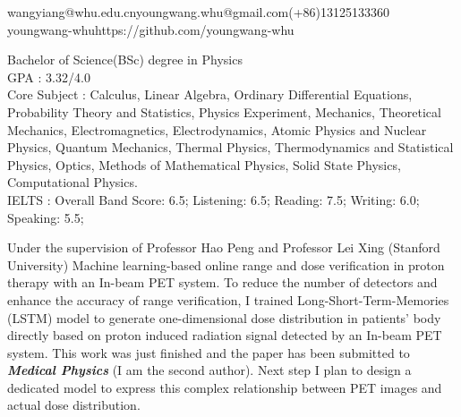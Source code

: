 \documentclass{resume}
\begin{document}
\name{ \textcolor[RGB]{172,0,230}{Yiang} \textcolor[RGB]{0,57,230}{Wang} }
{wangyiang@whu.edu.cn}{youngwang.whu@gmail.com}{(+86)13125133360}
{youngwang-whu}{https://github.com/youngwang-whu}




\textcolor[RGB]{172,0,230}{Bachelor of Science(BSc)} degree in \textcolor[RGB]{0,57,230}{Physics}\\
\textcolor[RGB]{172,0,230}{GPA} : \quad \textcolor[RGB]{0,57,230}{3.32/4.0} \\
\textcolor[RGB]{172,0,230}{Core Subject} :  \quad Calculus, \quad Linear Algebra, \quad Ordinary Differential Equations, \quad Probability Theory and Statistics,  \quad Physics Experiment, \quad Mechanics, \quad Theoretical Mechanics, \quad Electromagnetics, \quad Electrodynamics, \quad Atomic Physics and Nuclear Physics,  \quad Quantum Mechanics, \quad Thermal Physics, \quad Thermodynamics and Statistical Physics,  \quad Optics, \quad Methods of Mathematical Physics, \quad Solid State Physics, \quad Computational Physics. \\
\textcolor[RGB]{172,0,230}{IELTS} : \quad Overall Band Score: \textcolor[RGB]{0,57,230}{6.5}; \quad Listening: \textcolor[RGB]{0,57,230}{6.5}; \quad Reading: \textcolor[RGB]{0,57,230}{7.5}; \quad Writing: \textcolor[RGB]{0,57,230}{6.0}; \quad Speaking: \textcolor[RGB]{0,57,230}{5.5}; \\




%

{Under the supervision of Professor Hao Peng and Professor Lei Xing (Stanford University)}
{\textcolor[RGB]{172,0,230}{Machine learning-based online range and dose verification} in proton therapy with an In-beam PET system. To reduce the number of detectors and enhance the accuracy of range verification, I trained Long-Short-Term-Memories (LSTM) model to generate one-dimensional dose distribution in patients' body directly based on proton induced radiation signal detected by an In-beam PET system. This work was just finished and the paper has been submitted to \emph{\textbf{Medical Physics}} (I am the second author). Next step I plan to design a dedicated model to express this complex relationship between PET images and actual dose distribution.}
\end{document}
